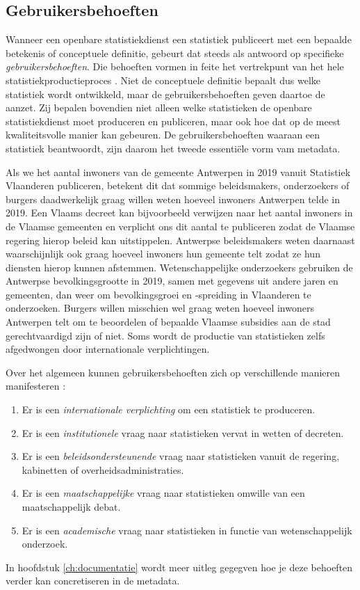 \documentclass[\mainfiledir/00_handleiding_statistiekproductie.tex]{subfiles}
\begin{document}
	


	
\subsection{Gebruikersbehoeften}
	
Wanneer een openbare statistiekdienst een statistiek publiceert met een bepaalde betekenis of conceptuele definitie, gebeurt dat steeds als antwoord op specifieke \emph{gebruikersbehoeften}. Die behoeften vormen in feite het vertrekpunt van het hele statistiekproductieproces \parencite{GSBPM2025}. Niet de conceptuele definitie bepaalt dus welke statistiek wordt ontwikkeld, maar de gebruikersbehoeften geven daartoe de aanzet. Zij bepalen bovendien niet alleen welke statistieken de openbare statistiekdienst moet produceren en publiceren, maar ook hoe dat op de meest kwaliteitsvolle manier kan gebeuren. De gebruikersbehoeften waaraan een statistiek beantwoordt, zijn daarom het tweede essentiële vorm vam metadata.	

Als we het aantal inwoners van de gemeente Antwerpen in 2019 vanuit Statistiek Vlaanderen publiceren, betekent dit dat sommige beleidsmakers, onderzoekers of burgers daadwerkelijk graag willen weten hoeveel inwoners Antwerpen telde in 2019. Een Vlaams decreet kan bijvoorbeeld verwijzen naar het aantal inwoners in de Vlaamse gemeenten en verplicht ons dit aantal te publiceren zodat de Vlaamse regering hierop beleid kan uitstippelen. Antwerpse beleidsmakers weten daarnaast waarschijnlijk ook graag hoeveel inwoners hun gemeente telt zodat ze hun diensten hierop kunnen afstemmen. Wetenschappelijke onderzoekers gebruiken de Antwerpse bevolkingsgrootte in 2019, samen met gegevens uit andere jaren en gemeenten, dan weer om bevolkingsgroei en ‐spreiding in Vlaanderen te onderzoeken. Burgers willen misschien wel graag weten hoeveel inwoners Antwerpen telt om te beoordelen of bepaalde Vlaamse subsidies aan de stad gerechtvaardigd zijn of niet. Soms wordt de productie van statistieken zelfs afgedwongen door internationale verplichtingen. 

Over het algemeen kunnen gebruikersbehoeften zich op verschillende manieren manifesteren \parencite{Eurostat2021ESShandbookmetadata}: 
\begin{enumerate}
    \item Er is een \emph{internationale verplichting} om een statistiek te produceren.
    \item Er is een \emph{institutionele} vraag naar statistieken vervat in wetten of decreten. 
    \item Er is een \emph{beleidsondersteunende} vraag naar statistieken vanuit de regering, kabinetten of overheidsadministraties.
    \item Er is een \emph{maatschappelijke} vraag naar statistieken omwille van een maatschappelijk debat.
    \item Er is een \emph{academische} vraag naar statistieken in functie van wetenschappelijk onderzoek.
\end{enumerate}
In hoofdstuk \ref{ch:documentatie} wordt meer uitleg gegegven hoe je deze behoeften verder kan concretiseren in de metadata.
\end{document}
